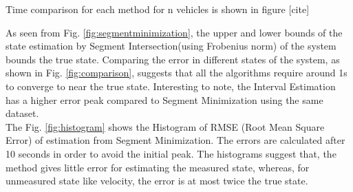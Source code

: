 Time comparison for each method for n vehicles is shown in figure [cite]

As seen from Fig. \ref{fig:segmentminimization}, the upper and lower bounds of the state estimation by Segment Intersection(using Frobenius norm) of the system bounds the true state. Comparing the error in different states of the system, as shown in Fig. \ref{fig:comparison}, suggests that all the algorithms require around 1s to converge to near the true state. Interesting to note, the Interval Estimation has a higher error peak compared to Segment Minimization using the same dataset.\\

The Fig. \ref{fig:histogram} shows the Histogram of RMSE (Root Mean Square Error) of estimation from Segment Minimization. The errors are calculated after 10 seconds in order to avoid the initial peak. The histograms suggest that, the method gives little error for estimating the measured state, whereas, for unmeasured state like velocity, the error is at most twice the true state.


